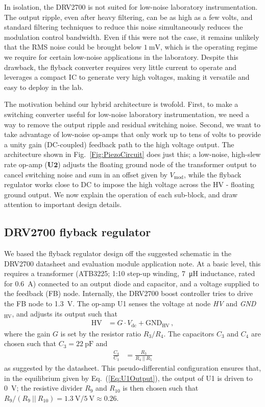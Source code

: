 \documentclass[aip,rsi,reprint]{revtex4-1} %
\begin{document}
In isolation, the DRV2700 is not suited for low-noise laboratory instrumentation. 
The output ripple, even after heavy filtering, can be as high as a few volts, and standard filtering techniques to reduce this noise simultaneously reduces the modulation control bandwidth.
Even if this were not the case, it remains unlikely that the RMS noise could be brought below $\SI{1}{\milli\volt}$, which is the operating regime we require for certain low-noise applications in the laboratory.
Despite this drawback, the flyback converter requires very little current to operate and leverages a compact IC to generate very high voltages, making it versatile and easy to deploy in the lab.

The motivation behind our hybrid architecture is twofold.
First, to make a switching converter useful for low-noise laboratory instrumentation, we need a way to remove the output ripple and residual switching noise.
Second, we want to take advantage of low-noise op-amps that only work up to tens of volts to provide a unity gain (DC-coupled) feedback path to the high voltage output.
The architecture shown in Fig.~\ref{Fig:PiezoCircuit} does just this; a low-noise, high-slew rate op-amp ($\mathbf{U2}$) adjusts the floating ground node of the transformer output to cancel switching noise and sum in an offset given by $V_{\text{mod}}$, while the flyback regulator works close to DC to impose the high voltage across the HV - floating ground output.
We now explain the operation of each sub-block, and draw attention to important design details.

\subsection{DRV2700 flyback regulator}
\label{Sec:DRV2700}

We based the flyback regulator design off the suggested schematic in the DRV2700 datasheet and evaluation module application note.
At a basic level, this requires a transformer (ATB3225; 1:10 step-up winding, \SI{7}{\micro\henry} inductance, rated for \SI{0.6}{\ampere}) connected to an output diode and capacitor, and a voltage supplied to the feedback (FB) node.
Internally, the DRV2700 boost controller tries to drive the FB node to \SI{1.3}{\volt}.
The op-amp U1 senses the voltage at node \textit{HV} and \textit{GND}${}_\text{HV}$, and adjusts its output such that
\begin{align}
\label{Eq:U1Output}
\text{HV} &= G\cdot V_{\text{dc}} + \text{GND}_{\text{HV}}\,,
\end{align}
where the gain $G$ is set by the resistor ratio $R_3/R_4$.
The capacitors $C_3$ and $C_4$ are chosen such that $C_3 = \SI{22}{\pico\farad}$ and 
\begin{align}
\frac{C_4}{C_3} &= \frac{R_3}{R_4~||~R_5}
\end{align}
as suggested by the datasheet.
This pseudo-differential configuration ensures that, in the equilibrium given by Eq.~(\ref{Eq:U1Output}), the output of U1 is driven to \SI{0}{\volt}; the resistive divider $R_9$ and $R_{10}$ is then chosen such that $R_9/(R_9~||~R_{10}) = \SI{1.3}{\volt}/\SI{5}{\volt} \approx \num{0.26}$.
\end{document}
